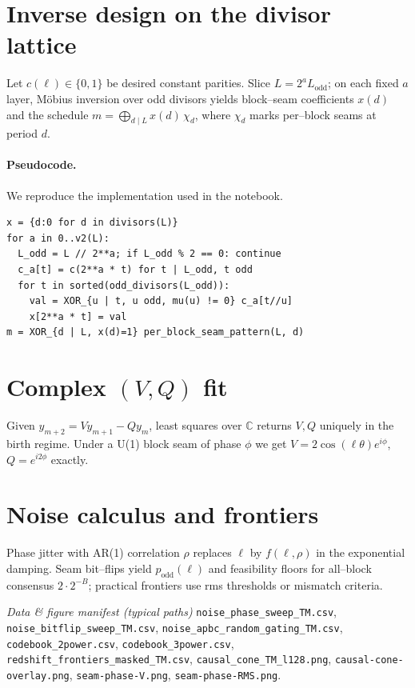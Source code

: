 \documentclass[11pt]{article}
\begin{document}
\appendix
\section{Inverse design on the divisor lattice}\label{app:inverse}
Let $c(\ell)\in\{0,1\}$ be desired constant parities. Slice $L=2^a L_{\mathrm{odd}}$; on each fixed $a$ layer, Möbius inversion over odd divisors yields block--seam coefficients $x(d)$ and the schedule $m=\bigoplus_{d\mid L} x(d)\,\chi_d$, where $\chi_d$ marks per--block seams at period $d$.
\paragraph{Pseudocode.} We reproduce the implementation used in the notebook.
\begin{verbatim}
x = {d:0 for d in divisors(L)}
for a in 0..v2(L):
  L_odd = L // 2**a; if L_odd % 2 == 0: continue
  c_a[t] = c(2**a * t) for t | L_odd, t odd
  for t in sorted(odd_divisors(L_odd)):
    val = XOR_{u | t, u odd, mu(u) != 0} c_a[t//u]
    x[2**a * t] = val
m = XOR_{d | L, x(d)=1} per_block_seam_pattern(L, d)
\end{verbatim}

\section{Complex $(V,Q)$ fit}\label{app:complex}
Given $y_{m+2}=V y_{m+1} - Q y_m$, least squares over $\mathbb{C}$ returns $V,Q$ uniquely in the birth regime. Under a U(1) block seam of phase $\phi$ we get $V=2\cos(\ell\theta)e^{i\phi}$, $Q=e^{i2\phi}$ exactly.

\section{Noise calculus and frontiers}\label{app:noise}
Phase jitter with AR(1) correlation $\rho$ replaces $\ell$ by $f(\ell,\rho)$ in the exponential damping. Seam bit--flips yield $p_{\mathrm{odd}}(\ell)$ and feasibility floors for all--block consensus $2\cdot 2^{-B}$; practical frontiers use rms thresholds or mismatch criteria.

\bigskip
\noindent\textit{Data \& figure manifest (typical paths)}\quad
\texttt{noise\_phase\_sweep\_TM.csv}, \texttt{noise\_bitflip\_sweep\_TM.csv}, \texttt{noise\_apbc\_random\_gating\_TM.csv}, \texttt{codebook\_2power.csv}, \texttt{codebook\_3power.csv}, \texttt{redshift\_frontiers\_masked\_TM.csv}, \texttt{causal\_cone\_TM\_l128.png}, \texttt{causal-cone-overlay.png}, \texttt{seam-phase-V.png}, \texttt{seam-phase-RMS.png}.
\end{document}
